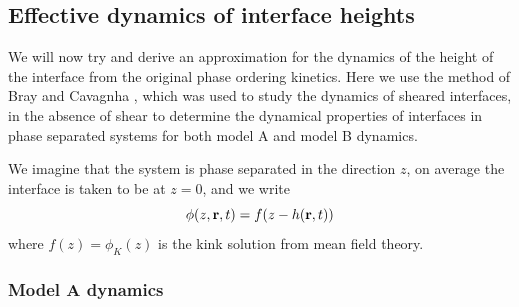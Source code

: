 \subsection{Effective dynamics of interface heights}
\label{sec-heightd}
We will now try and derive an approximation for the dynamics of the height of the interface from the original phase ordering kinetics. Here we use the method of Bray and Cavagnha \cite{bray_interface_2001,bray_interface_2001-1}, which was used to study the dynamics of sheared interfaces, in the absence of shear to determine the dynamical properties of interfaces in phase separated systems for both model A and model B dynamics.

We imagine that the system is phase separated in the direction $z$, on average the interface is taken to be at $z=0$, and we write
\begin{equation}
\phi(z,{\bf r},t) = f(z-h({\bf r},t))
\label{hans}
\end{equation}
where $f(z)=\phi_K(z)$ is the kink solution from mean field theory.

\subsubsection{Model A dynamics}

